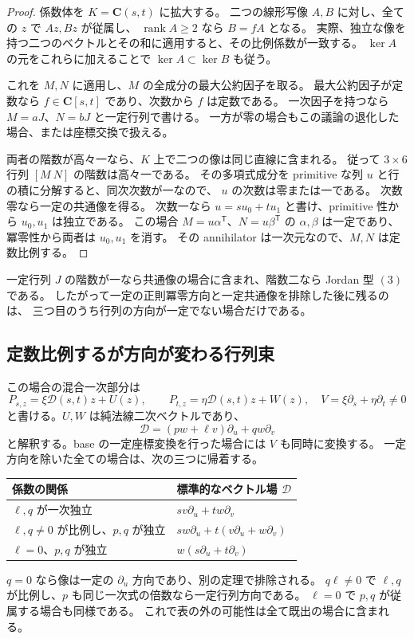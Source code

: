 \documentclass[11pt,a4paper]{ltjsarticle}
\newcommand{\CC}{\mathbf C}\newcommand{\QQ}{\mathbf Q}
\DeclareMathOperator{\rank}{rank}\DeclareMathOperator{\tr}{tr}
\theoremstyle{remark}\newtheorem{remark}[theorem]{注意}
\begin{document}
\begin{proof}
係数体を $K=\CC(s,t)$ に拡大する。
二つの線形写像 $A,B$ に対し、全ての $z$ で $Az,Bz$ が従属し、
$\rank A\ge2$ なら $B=fA$ となる。
実際、独立な像を持つ二つのベクトルとその和に適用すると、その比例係数が一致する。
$\ker A$ の元をこれらに加えることで $\ker A\subset\ker B$ も従う。

これを $M,N$ に適用し、$M$ の全成分の最大公約因子を取る。
最大公約因子が定数なら $f\in\CC[s,t]$ であり、次数から $f$ は定数である。
一次因子を持つなら $M=aJ$、$N=bJ$ と一定行列で書ける。
一方が零の場合もこの議論の退化した場合、または座標交換で扱える。

両者の階数が高々一なら、$K$ 上で二つの像は同じ直線に含まれる。
従って $3\times6$ 行列 $[M\ N]$ の階数は高々一である。
その多項式成分を primitive な列 $u$ と行の積に分解すると、同次次数が一なので、
$u$ の次数は零または一である。
次数零なら一定の共通像を得る。
次数一なら $u=su_0+tu_1$ と書け、primitive 性から $u_0,u_1$ は独立である。
この場合 $M=u\alpha^{\mathsf T}$、$N=u\beta^{\mathsf T}$ の
$\alpha,\beta$ は一定であり、冪零性から両者は $u_0,u_1$ を消す。
その annihilator は一次元なので、$M,N$ は定数比例する。
\end{proof}

一定行列 $J$ の階数が一なら共通像の場合に含まれ、階数二なら Jordan 型 $(3)$ である。
したがって一定の正則冪零方向と一定共通像を排除した後に残るのは、
三つ目のうち行列の方向が一定でない場合だけである。

\subsection{定数比例するが方向が変わる行列束}

この場合の混合一次部分は
\[
 P_{s,z}=\xi\mathcal D(s,t)z+U(z),\qquad
 P_{t,z}=\eta\mathcal D(s,t)z+W(z),
 \quad V=\xi\partial_s+\eta\partial_t\ne0
\]
と書ける。$U,W$ は純法線二次ベクトルであり、
\[
 \mathcal D=(pw+\ell v)\partial_u+qw\partial_v
\]
と解釈する。base の一定座標変換を行った場合には $V$ も同時に変換する。
一定方向を除いた全ての場合は、次の三つに帰着する。
\begin{center}
\begin{tabular}{p{55mm}p{67mm}}
\toprule
係数の関係 & 標準的なベクトル場 $\mathcal D$\\
\midrule
$\ell,q$ が一次独立 & $sv\partial_u+tw\partial_v$\\[1mm]
$\ell,q\ne0$ が比例し、$p,q$ が独立
 & $sw\partial_u+t(v\partial_u+w\partial_v)$\\[1mm]
$\ell=0$、$p,q$ が独立 & $w(s\partial_u+t\partial_v)$\\
\bottomrule
\end{tabular}
\end{center}
$q=0$ なら像は一定の $\partial_u$ 方向であり、別の定理で排除される。
$q\ell\ne0$ で $\ell,q$ が比例し、$p$ も同じ一次式の倍数なら一定行列方向である。
$\ell=0$ で $p,q$ が従属する場合も同様である。
これで表の外の可能性は全て既出の場合に含まれる。
\end{document}
